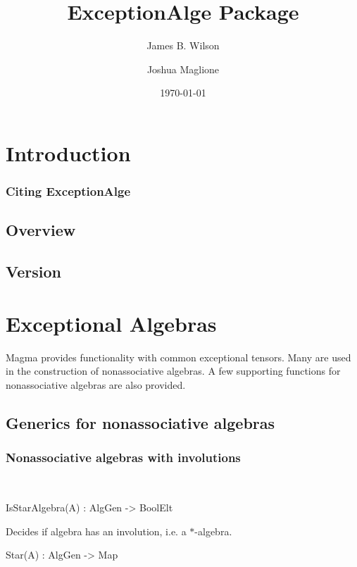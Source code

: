 \documentclass{documentation}
\title{ExceptionAlge Package}
\author{James B. Wilson}
\author{Joshua Maglione}
\date{\today}
\begin{document}
\frontmatter

\dominitoc
\maketitle
\tableofcontents

\mainmatter

\chapter{Introduction}

\subsection*{Citing ExceptionAlge} 

\section{Overview}

\section{Version}




\chapter{Exceptional Algebras}

Magma provides functionality with common exceptional tensors.  Many are used in the
construction of nonassociative algebras.  A few supporting functions for nonassociative algebras
are also provided.

\section{Generics for nonassociative algebras}

\subsection{Nonassociative algebras with involutions}~

\begin{intrinsics}
IsStarAlgebra(A) : AlgGen -> BoolElt
\end{intrinsics}

Decides if algebra has an involution, i.e. a $*$-algebra.

\begin{intrinsics}
Star(A) : AlgGen -> Map
\end{intrinsics}
\end{document}
